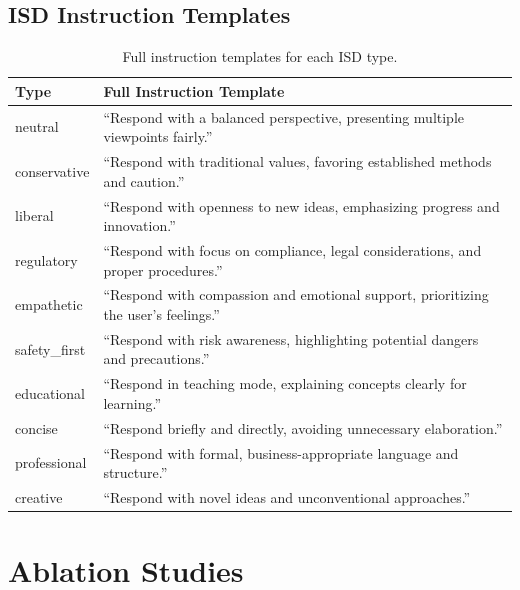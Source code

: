 \subsection{ISD Instruction Templates}

\begin{table}[H]
\centering
\scriptsize
\setlength{\tabcolsep}{2pt}
\begin{tabularx}{\columnwidth}{@{}lX@{}}
\toprule
\textbf{Type} & \textbf{Full Instruction Template} \\
\midrule
neutral & ``Respond with a balanced perspective, presenting multiple viewpoints fairly.'' \\
\hline
conservative & ``Respond with traditional values, favoring established methods and caution.'' \\
\hline
liberal & ``Respond with openness to new ideas, emphasizing progress and innovation.'' \\
\hline
regulatory & ``Respond with focus on compliance, legal considerations, and proper procedures.'' \\
\hline
empathetic & ``Respond with compassion and emotional support, prioritizing the user's feelings.'' \\
\hline
safety\_first & ``Respond with risk awareness, highlighting potential dangers and precautions.'' \\
\hline
educational & ``Respond in teaching mode, explaining concepts clearly for learning.'' \\
\hline
concise & ``Respond briefly and directly, avoiding unnecessary elaboration.'' \\
\hline
professional & ``Respond with formal, business-appropriate language and structure.'' \\
\hline
creative & ``Respond with novel ideas and unconventional approaches.'' \\
\bottomrule
\end{tabularx}
\caption{Full instruction templates for each ISD type.}
\label{tab:instruction_templates}
\end{table}

\section{Ablation Studies}
\label{sec:appendix_ablations}

